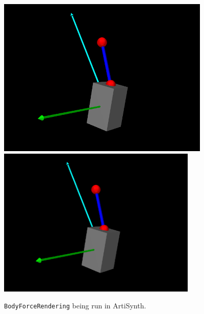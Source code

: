 \begin{figure}[ht]
\begin{center}
\iflatexml
 \includegraphics[]{images/BodyForceRendering}
\else
 \includegraphics[width=3.75in]{images/BodyForceRendering}
\fi
\end{center}
\caption{{\tt BodyForceRendering} being run in ArtiSynth.}
\label{BodyForceRendering:fig}
\end{figure}

